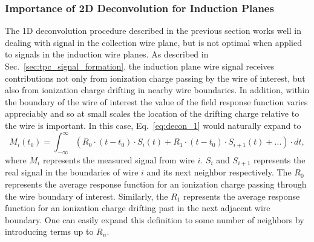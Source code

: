 \subsubsection{Importance of 2D Deconvolution for Induction Planes}
The 1D deconvolution procedure described in the previous section 
works well in dealing with signal in the collection wire plane, but is not 
optimal when applied to signals in the induction wire planes. 
As described in Sec.~\ref{sec:tpc_signal_formation}, the induction plane wire 
signal receives contributions not only from ionization charge 
passing by the wire of interest, but also from ionization charge drifting in 
nearby wire boundaries. In addition, within the boundary of the wire of 
interest the value of the field response function varies appreciably 
and so at small scales the location of the drifting charge relative to the wire 
is important. In this case, Eq.~\ref{eq:decon_1} would naturally expand to 
\begin{equation}\label{eq:decon_2d_1}
M_i(t_0) = \int_{-\infty}^{\infty} \left( R_0 \cdot (t-t_0) \cdot S_i(t) + 
R_1 \cdot (t-t_0) \cdot S_{i+1} (t) + ...\right) \cdot dt,
\end{equation}
where $M_i$ represents the measured signal from wire $i$.  $S_i$ and
$S_{i+1}$ represents the real signal in the boundaries of wire $i$ and
its next neighbor respectively.
The $R_0$ represents the average response function for an ionization
charge passing through the wire boundary of interest.
Similarly, the $R_1$ represents the average response function for an
ionization charge drifting past in the next adjacent wire boundary. One can
easily expand this definition to some number of neighbors by introducing terms up 
to $R_n$.


